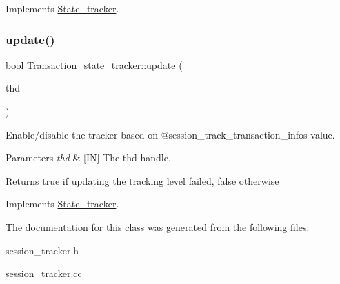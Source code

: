 Implements \mbox{\hyperlink{classState__tracker_aee5cd5c5ed19fbd4c8ac01dbd62471e7}{State\+\_\+tracker}}.

\mbox{\label{classTransaction__state__tracker_a96e814f8253741480125787405add62a}} 
\subsubsection{\texorpdfstring{update()}{update()}}
{\footnotesize\ttfamily bool Transaction\+\_\+state\+\_\+tracker\+::update (\begin{DoxyParamCaption}\item[{T\+HD $\ast$}]{thd }\end{DoxyParamCaption})\hspace{0.3cm}{\ttfamily [virtual]}}



Enable/disable the tracker based on @session\+\_\+track\+\_\+transaction\+\_\+info\textquotesingle{}s value. 


\begin{DoxyParams}{Parameters}
{\em thd} & \mbox{[}IN\mbox{]} The thd handle.\\
\hline
\end{DoxyParams}
\begin{DoxyReturn}{Returns}
true if updating the tracking level failed, false otherwise 
\end{DoxyReturn}


Implements \mbox{\hyperlink{classState__tracker_a74ffdcb79733e8d31e9fe2dcae346022}{State\+\_\+tracker}}.



The documentation for this class was generated from the following files\+:\begin{DoxyCompactItemize}
\item 
session\+\_\+tracker.\+h\item 
session\+\_\+tracker.\+cc\end{DoxyCompactItemize}
